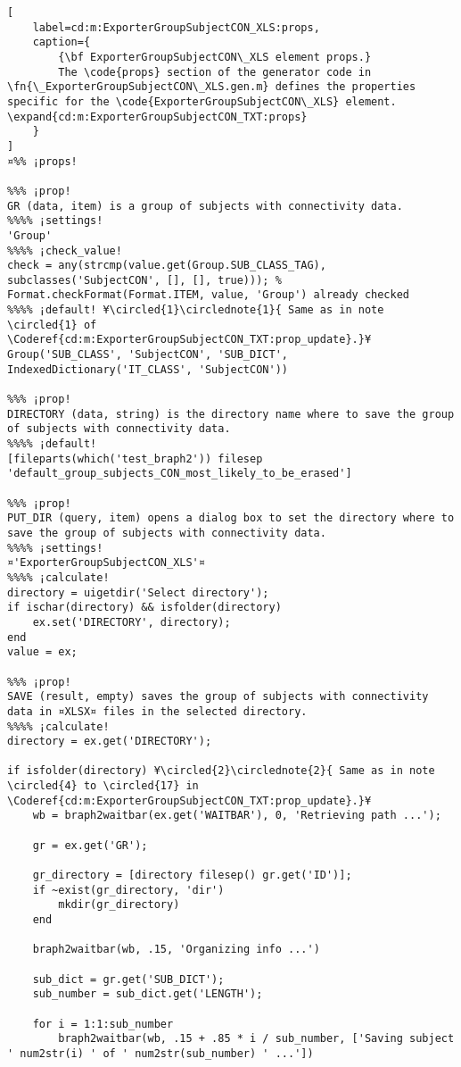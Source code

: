 \documentclass{tufte-handout}
\begin{document}
\begin{lstlisting}[
	label=cd:m:ExporterGroupSubjectCON_XLS:props,
	caption={
		{\bf ExporterGroupSubjectCON\_XLS element props.}
		The \code{props} section of the generator code in \fn{\_ExporterGroupSubjectCON\_XLS.gen.m} defines the properties specific for the \code{ExporterGroupSubjectCON\_XLS} element. \expand{cd:m:ExporterGroupSubjectCON_TXT:props}
	}
]
¤%% ¡props!

%%% ¡prop!
GR (data, item) is a group of subjects with connectivity data.
%%%% ¡settings!
'Group'
%%%% ¡check_value!
check = any(strcmp(value.get(Group.SUB_CLASS_TAG), subclasses('SubjectCON', [], [], true))); % Format.checkFormat(Format.ITEM, value, 'Group') already checked
%%%% ¡default! ¥\circled{1}\circlednote{1}{ Same as in note \circled{1} of \Coderef{cd:m:ExporterGroupSubjectCON_TXT:prop_update}.}¥
Group('SUB_CLASS', 'SubjectCON', 'SUB_DICT', IndexedDictionary('IT_CLASS', 'SubjectCON'))

%%% ¡prop!
DIRECTORY (data, string) is the directory name where to save the group of subjects with connectivity data.
%%%% ¡default!
[fileparts(which('test_braph2')) filesep 'default_group_subjects_CON_most_likely_to_be_erased']

%%% ¡prop!
PUT_DIR (query, item) opens a dialog box to set the directory where to save the group of subjects with connectivity data.
%%%% ¡settings!
¤'ExporterGroupSubjectCON_XLS'¤
%%%% ¡calculate!
directory = uigetdir('Select directory');
if ischar(directory) && isfolder(directory)
    ex.set('DIRECTORY', directory);
end
value = ex;

%%% ¡prop!
SAVE (result, empty) saves the group of subjects with connectivity data in ¤XLSX¤ files in the selected directory.
%%%% ¡calculate!
directory = ex.get('DIRECTORY');

if isfolder(directory) ¥\circled{2}\circlednote{2}{ Same as in note \circled{4} to \circled{17} in \Coderef{cd:m:ExporterGroupSubjectCON_TXT:prop_update}.}¥
    wb = braph2waitbar(ex.get('WAITBAR'), 0, 'Retrieving path ...');
    
    gr = ex.get('GR');

    gr_directory = [directory filesep() gr.get('ID')];
    if ~exist(gr_directory, 'dir')
        mkdir(gr_directory)
    end
    
	braph2waitbar(wb, .15, 'Organizing info ...')
    
    sub_dict = gr.get('SUB_DICT');
    sub_number = sub_dict.get('LENGTH');

    for i = 1:1:sub_number
        braph2waitbar(wb, .15 + .85 * i / sub_number, ['Saving subject ' num2str(i) ' of ' num2str(sub_number) ' ...'])
        

\end{lstlisting}
\end{document}
